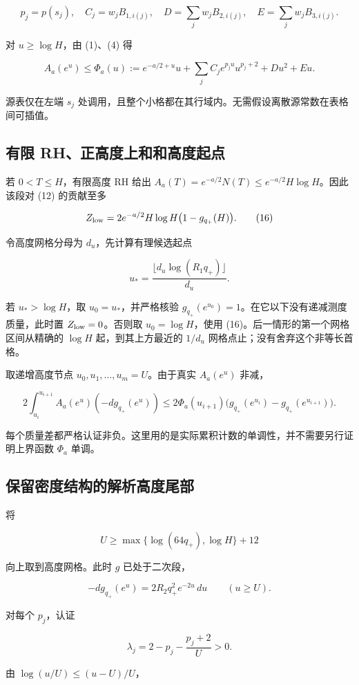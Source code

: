 \documentclass[UTF8,zihao=-4,fontset=fandol]{ctexart}
\begin{document}
\[
p_j=p(s_j),\quad C_j=w_jB_{1,i(j)},\quad
D=\sum_jw_jB_{2,i(j)},\quad E=\sum_jw_jB_{3,i(j)}.
\]

对 \(u\ge\log H\)，由 (1)、(4) 得

\[
A_a(e^u)\le\Phi_a(u)
:=e^{-a/2+u}u+\sum_j C_j e^{p_ju}u^{p_j+2}+Du^2+Eu. \tag{15}
\]

源表仅在左端 \(s_j\) 处调用，且整个小格都在其行域内。无需假设离散源常数在表格间可插值。

\subsection{有限 RH、正高度上和和高度起点}

若 \(0<T\le H\)，有限高度 RH 给出 \(A_a(T)=e^{-a/2}N(T)\le e^{-a/2}H\log H\)。因此该段对 (12) 的贡献至多

\[
Z_{\rm low}=2e^{-a/2}H\log H\bigl(1-g_{q_+}(H)\bigr). \tag{16}
\]

令高度网格分母为 \(d_u\)，先计算有理候选起点

\[
u_*=
\frac{\lfloor d_u\log(R_1q_+)\rfloor}{d_u}.
\]

若 \(u_*>\log H\)，取 \(u_0=u_*\)，并严格核验 \(g_{q_+}(e^{u_0})=1\)。在它以下没有递减测度质量，此时置 \(Z_{\rm low}=0\)。否则取 \(u_0=\log H\)，使用 (16)。后一情形的第一个网格区间从精确的 \(\log H\) 起，到其上方最近的 \(1/d_u\) 网格点止；没有舍弃这个非等长首格。

取递增高度节点 \(u_0,u_1,\ldots,u_m=U\)。由于真实 \(A_a(e^u)\) 非减，

\[
2\int_{u_i}^{u_{i+1}}A_a(e^u)(-d g_{q_+}(e^u))
\le2\Phi_a(u_{i+1})
\bigl(g_{q_+}(e^{u_i})-g_{q_+}(e^{u_{i+1}})\bigr). \tag{17}
\]

每个质量差都严格认证非负。这里用的是实际累积计数的单调性，并不需要另行证明上界函数 \(\Phi_a\) 单调。

\subsection{保留密度结构的解析高度尾部}

将

\[
U\ge\max\{\log(64q_+),\log H\}+12
\]

向上取到高度网格。此时 \(g\) 已处于二次段，

\[
-d g_{q_+}(e^u)=2R_2q_+^2e^{-2u}\,du\qquad(u\ge U).
\]

对每个 \(p_j\)，认证

\[
\lambda_j=2-p_j-\frac{p_j+2}{U}>0.
\]

由 \(\log(u/U)\le(u-U)/U\)，
\end{document}
